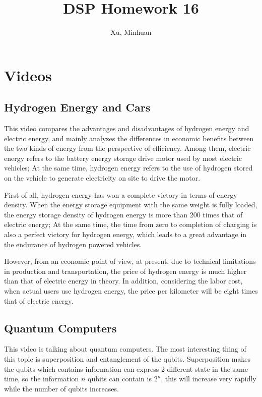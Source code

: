 \documentclass{article}
\begin{document}
\title{DSP Homework 16}
\author{Xu, Minhuan}
\maketitle
\tableofcontents
\begin{abstract}

\end{abstract}

\section{Videos}
\subsection{Hydrogen Energy and Cars}
This video compares the advantages and disadvantages of hydrogen energy and electric energy, and mainly analyzes the differences in economic benefits between the two kinds of energy from the perspective of efficiency. Among them, electric energy refers to the battery energy storage drive motor used by most electric vehicles; At the same time, hydrogen energy refers to the use of hydrogen stored on the vehicle to generate electricity on site to drive the motor.

First of all, hydrogen energy has won a complete victory in terms of energy density. When the energy storage equipment with the same weight is fully loaded, the energy storage density of hydrogen energy is more than 200 times that of electric energy; At the same time, the time from zero to completion of charging is also a perfect victory for hydrogen energy, which leads to a great advantage in the endurance of hydrogen powered vehicles.

However, from an economic point of view, at present, due to technical limitations in production and transportation, the price of hydrogen energy is much higher than that of electric energy in theory. In addition, considering the labor cost, when actual users use hydrogen energy, the price per kilometer will be eight times that of electric energy.
\subsection{Quantum Computers}
This video is talking about quantum computers. The most interesting thing of this topic is superposition and entanglement of the qubits. Superposition makes the qubits which contains information can express 2 different state in the same time, so the information $n$ qubits can contain is $2^n$, this will increase very rapidly while the number of qubits increases.
\end{document}
